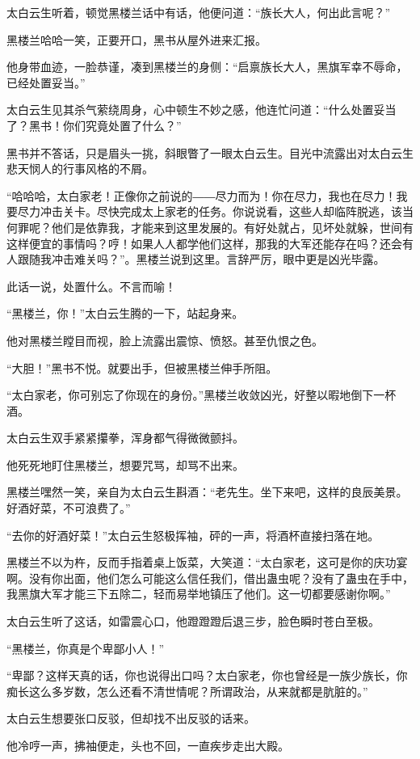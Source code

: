 \begin{this_body}
太白云生听着，顿觉黑楼兰话中有话，他便问道：“族长大人，何出此言呢？”

黑楼兰哈哈一笑，正要开口，黑书从屋外进来汇报。

他身带血迹，一脸恭谨，凑到黑楼兰的身侧：“启禀族长大人，黑旗军幸不辱命，已经处置妥当。”

太白云生见其杀气萦绕周身，心中顿生不妙之感，他连忙问道：“什么处置妥当了？黑书！你们究竟处置了什么？”

黑书并不答话，只是眉头一挑，斜眼瞥了一眼太白云生。目光中流露出对太白云生悲天悯人的行事风格的不屑。

“哈哈哈，太白家老！正像你之前说的――尽力而为！你在尽力，我也在尽力！我要尽力冲击关卡。尽快完成太上家老的任务。你说说看，这些人却临阵脱逃，该当何罪呢？他们是依靠我，才能来到这里发展的。有好处就占，见坏处就躲，世间有这样便宜的事情吗？哼！如果人人都学他们这样，那我的大军还能存在吗？还会有人跟随我冲击难关吗？”。黑楼兰说到这里。言辞严厉，眼中更是凶光毕露。

此话一说，处置什么。不言而喻！

“黑楼兰，你！”太白云生腾的一下，站起身来。

他对黑楼兰瞠目而视，脸上流露出震惊、愤怒。甚至仇恨之色。

“大胆！”黑书不悦。就要出手，但被黑楼兰伸手所阻。

“太白家老，你可别忘了你现在的身份。”黑楼兰收敛凶光，好整以暇地倒下一杯酒。

太白云生双手紧紧攥拳，浑身都气得微微颤抖。

他死死地盯住黑楼兰，想要咒骂，却骂不出来。

黑楼兰嘿然一笑，亲自为太白云生斟酒：“老先生。坐下来吧，这样的良辰美景。好酒好菜，不可浪费了。”

“去你的好酒好菜！”太白云生怒极挥袖，砰的一声，将酒杯直接扫落在地。

黑楼兰不以为杵，反而手指着桌上饭菜，大笑道：“太白家老，这可是你的庆功宴啊。没有你出面，他们怎么可能这么信任我们，借出蛊虫呢？没有了蛊虫在手中，我黑旗大军才能三下五除二，轻而易举地镇压了他们。这一切都要感谢你啊。”

太白云生听了这话，如雷震心口，他蹬蹬蹬后退三步，脸色瞬时苍白至极。

“黑楼兰，你真是个卑鄙小人！”

“卑鄙？这样天真的话，你也说得出口吗？太白家老，你也曾经是一族少族长，你痴长这么多岁数，怎么还看不清世情呢？所谓政治，从来就都是肮脏的。”

太白云生想要张口反驳，但却找不出反驳的话来。

他冷哼一声，拂袖便走，头也不回，一直疾步走出大殿。


\end{this_body}
